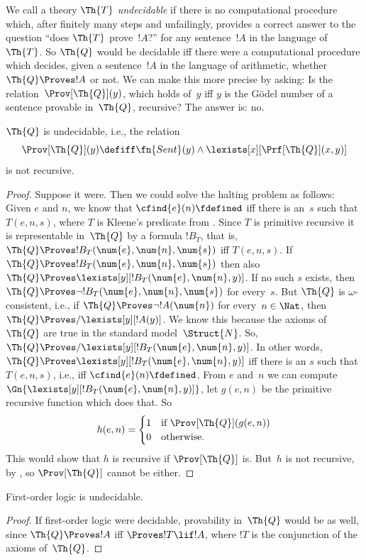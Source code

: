 \documentclass[../../../include/open-logic-section]{subfiles}
\begin{document}

We call a theory $\Th{T}$ \emph{undecidable} if there is no
computational procedure which, after finitely many steps and
unfailingly, provides a correct answer to the question ``does $\Th{T}$
prove~$!A$?'' for any sentence~$!A$ in the language of~$\Th{T}$.  So
$\Th{Q}$ would be decidable iff there were a computational procedure
which decides, given a sentence~$!A$ in the language of arithmetic,
whether $\Th{Q} \Proves !A$ or not.  We can make this more precise by
asking: Is the relation~$\Prov[\Th{Q}](y)$, which holds of~$y$
iff $y$ is the G\"odel number of a sentence provable in~$\Th{Q}$,
recursive?  The answer is: no.

\begin{thm}
$\Th{Q}$ is undecidable, i.e., the relation
\[
\Prov[\Th{Q}](y) \defiff \fn{Sent}(y) \land
\lexists[x][\Prf[\Th{Q}](x, y)]
\]
is not recursive.
\end{thm}

\begin{proof}
Suppose it were.  Then we could solve the halting problem as follows:
Given $e$ and $n$, we know that $\cfind{e}(n) \fdefined$ iff there is
an~$s$ such that $T(e, n, s)$, where $T$ is Kleene's predicate from
.  Since $T$ is primitive recursive
it is representable in~$\Th{Q}$ by a formula $!B_T$, that is, $\Th{Q}
\Proves !B_T(\num{e}, \num{n}, \num{s})$ iff $T(e, n, s)$.  If $\Th{Q}
\Proves !B_T(\num{e}, \num{n}, \num{s})$ then also $ \Th{Q} \Proves
\lexists[y][!B_T(\num{e}, \num{n}, y)]$.  If no such $s$ exists, then
$\Th{Q} \Proves \lnot !B_T(\num{e}, \num{n}, \num{s})$ for
every~$s$.  But $\Th{Q}$ is $\omega$-consistent, i.e., if $\Th{Q}
\Proves \lnot !A(\num{n})$ for every~$n \in \Nat$, then $\Th{Q}
\Proves/ \lexists[y][!A(y)]$.  We know this because the axioms of
$\Th{Q}$ are true in the standard model~$\Struct{N}$.  So, $\Th{Q}
\Proves/ \lexists[y][!B_T(\num{e}, \num{n}, y)]$.  In other words,
$\Th{Q} \Proves \lexists[y][!B_T(\num{e}, \num{n}, y)]$ iff there is
an $s$ such that $T(e, n, s)$, i.e., iff $\cfind{e}(n) \fdefined$.
From $e$ and~$n$ we can compute $\Gn{\lexists[y][!B_T(\num{e},
    \num{n}, y)]}$, let $g(e, n)$ be the primitive recursive function
which does that.  So
\[
h(e, n) =
\begin{cases}
1 & \text{if $\Prov[\Th{Q}](g(e, n))$}\\
0 & \text{otherwise}.
\end{cases}
\]
This would show that $h$ is recursive if $\Prov[\Th{Q}]$ is. But~$h$
is not recursive, by , so
$\Prov[\Th{Q}]$ cannot be either.
\end{proof}

\begin{cor}
First-order logic is undecidable.
\end{cor}

\begin{proof}
If first-order logic were decidable, provability in~$\Th{Q}$ would be
as well, since $\Th{Q} \Proves !A$ iff $\Proves !T \lif !A$, where
$!T$ is the conjunction of the axioms of~$\Th{Q}$.
\end{proof}
\end{document}
